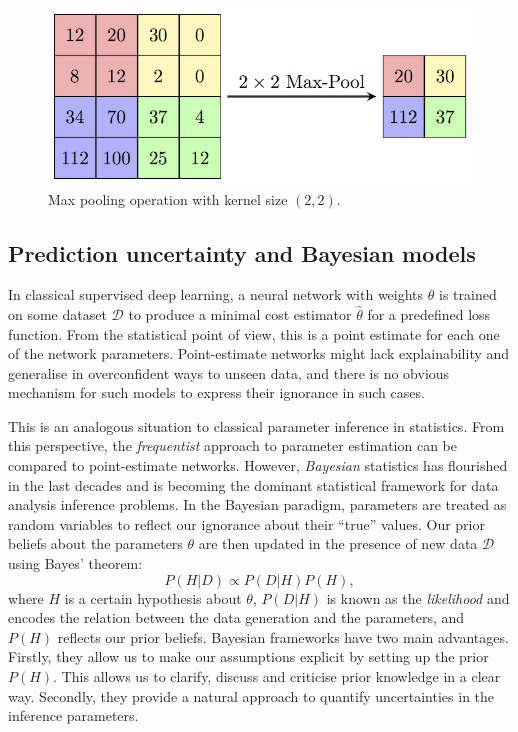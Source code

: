 \begin{figure}
    \centering
    \includegraphics[width=0.6\linewidth]{img/ML/MaxpoolSample2.png}
    \caption{Max pooling operation with kernel size $(2,2)$.}
    \label{fig:ML max pool}
\end{figure}

\subsection{Prediction uncertainty and Bayesian models}
In classical supervised deep learning, a neural network with weights $\theta$ is trained on some dataset $\mathcal{D}$ to produce a minimal cost estimator $\hat{\theta}$ for a predefined loss function. From the statistical point of view, this is a point estimate for each one of the network parameters. Point-estimate networks might lack explainability and generalise in overconfident ways to unseen data, and there is no obvious mechanism for such models to express their ignorance in such cases.


This is an analogous situation to classical parameter inference in statistics. From this perspective, the \emph{frequentist} approach to parameter estimation can be compared to point-estimate networks.
However, \emph{Bayesian} statistics \cite{bayesian_stat} has flourished in the last decades and is becoming the dominant statistical framework for data analysis inference problems. In the Bayesian paradigm, parameters are treated as random variables to reflect our ignorance about their ``true'' values. Our prior beliefs about the parameters $\theta$ are then updated in the presence of new data $\mathcal{D}$ using Bayes' theorem:
\begin{equation}\label{eq:Bayes theorem}
    P(H|D) \propto P(D|H)P(H),
\end{equation}
where $H$ is a certain hypothesis about $\theta$, $P(D|H)$ is known as the \emph{likelihood} and encodes the relation between the data generation and the parameters, and $P(H)$ reflects our prior beliefs. Bayesian frameworks have two main advantages. Firstly, they allow us to make our assumptions explicit by setting up the prior $P(H)$. This allows us to clarify, discuss and criticise prior knowledge in a clear way. Secondly, they provide a natural approach to quantify uncertainties in the inference parameters.



